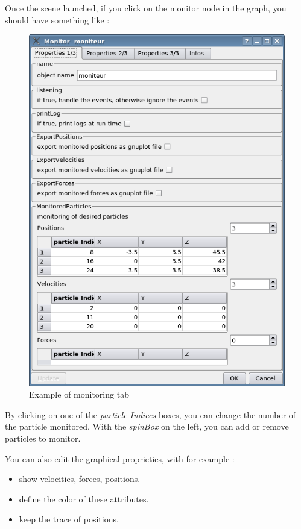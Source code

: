 \documentclass[a4paper,10pt]{article}
\begin{document}
\begin{enumerate}
Once the scene launched, if you click on the monitor node in the graph, you should have something like :


	\begin{figure} [h]
	\includegraphics[scale=0.5] {QTableMonitor.png}
	\caption{Example of monitoring tab}
	\label{figure1}
	\end{figure}


By clicking on one of the \textit{particle Indices} boxes, you can change the number of the particle monitored.
With the \textit{spinBox} on the left, you can add or remove particles to monitor.

\pagebreak

You can also edit the graphical proprieties, with for example : \\
\begin{itemize}
	\item show velocities, forces, positions.
	\item define the color of these attributes.
	\item keep the trace of positions.
\end{itemize}


\end{enumerate}
\end{document}
